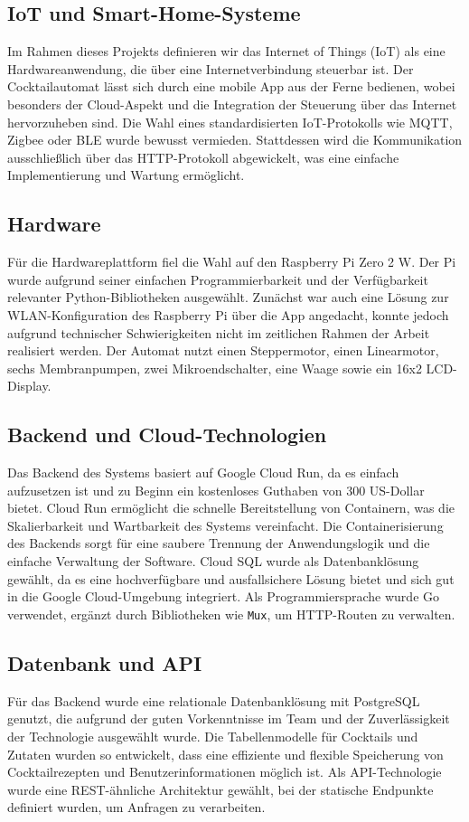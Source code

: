 \subsection{IoT und Smart-Home-Systeme}
Im Rahmen dieses Projekts definieren wir das Internet of Things (IoT) als eine Hardwareanwendung, 
die über eine Internetverbindung steuerbar ist. Der Cocktailautomat lässt sich durch eine mobile 
App aus der Ferne bedienen, wobei besonders der Cloud-Aspekt und die Integration der Steuerung über 
das Internet hervorzuheben sind. Die Wahl eines standardisierten IoT-Protokolls wie MQTT, Zigbee 
oder BLE wurde bewusst vermieden. Stattdessen wird die Kommunikation ausschließlich über das 
HTTP-Protokoll abgewickelt, was eine einfache Implementierung und Wartung ermöglicht.

\subsection{Hardware}
Für die Hardwareplattform fiel die Wahl auf den Raspberry Pi Zero 2 W. Der Pi wurde aufgrund seiner 
einfachen Programmierbarkeit und der Verfügbarkeit relevanter Python-Bibliotheken ausgewählt. 
Zunächst war auch eine Lösung zur WLAN-Konfiguration des Raspberry Pi über die App angedacht, konnte 
jedoch aufgrund technischer Schwierigkeiten nicht im zeitlichen Rahmen der Arbeit realisiert werden. 
Der Automat nutzt einen Steppermotor, einen Linearmotor, sechs Membranpumpen, zwei Mikroendschalter, 
eine Waage sowie ein 16x2 LCD-Display.

\subsection{Backend und Cloud-Technologien}
Das Backend des Systems basiert auf Google Cloud Run, da es einfach aufzusetzen ist und zu Beginn 
ein kostenloses Guthaben von 300 US-Dollar bietet. Cloud Run ermöglicht die schnelle Bereitstellung 
von Containern, was die Skalierbarkeit und Wartbarkeit des Systems vereinfacht. Die 
Containerisierung des Backends sorgt für eine saubere Trennung der Anwendungslogik und die einfache 
Verwaltung der Software. Cloud SQL wurde als Datenbanklösung gewählt, da es eine hochverfügbare und 
ausfallsichere Lösung bietet und sich gut in die Google Cloud-Umgebung integriert. Als 
Programmiersprache wurde Go verwendet, ergänzt durch Bibliotheken wie \texttt{Mux}, um HTTP-Routen 
zu verwalten.

\subsection{Datenbank und API}
Für das Backend wurde eine relationale Datenbanklösung mit PostgreSQL genutzt, die aufgrund der 
guten Vorkenntnisse im Team und der Zuverlässigkeit der Technologie ausgewählt wurde. Die 
Tabellenmodelle für Cocktails und Zutaten wurden so entwickelt, dass eine effiziente und flexible 
Speicherung von Cocktailrezepten und Benutzerinformationen möglich ist. Als API-Technologie wurde 
eine REST-ähnliche Architektur gewählt, bei der statische Endpunkte definiert wurden, um Anfragen 
zu verarbeiten.

